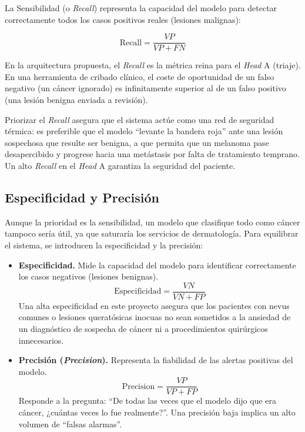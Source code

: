 La Sensibilidad (o \textit{Recall}) representa la capacidad del modelo para detectar correctamente todos los casos positivos reales (lesiones malignas):

\begin{equation}
	\text{Recall} = \frac{VP}{VP + FN}
\end{equation}

En la arquitectura propuesta, el \textit{Recall} es la métrica reina para el \textit{Head} A (triaje). En una herramienta de cribado clínico, el coste de oportunidad de un falso negativo (un cáncer ignorado) es infinitamente superior al de un falso positivo (una lesión benigna enviada a revisión).

Priorizar el \textit{Recall} asegura que el sistema actúe como una red de seguridad térmica: es preferible que el modelo ``levante la bandera roja'' ante una lesión sospechosa que resulte ser benigna, a que permita que un melanoma pase desapercibido y progrese hacia una metástasis por falta de tratamiento temprano. Un alto \textit{Recall} en el \textit{Head} A garantiza la seguridad del paciente.

\subsection{Especificidad y Precisión}

Aunque la prioridad es la sensibilidad, un modelo que clasifique todo como cáncer tampoco sería útil, ya que saturaría los servicios de dermatología. Para equilibrar el sistema, se introducen la especificidad y la precisión:

\begin{itemize}
	\item \textbf{Especificidad.} Mide la capacidad del modelo para identificar correctamente los casos negativos (lesiones benignas).
	\begin{equation}
		\text{Especificidad} = \frac{VN}{VN + FP}
	\end{equation}
	Una alta especificidad en este proyecto asegura que los pacientes con nevus comunes o lesiones queratósicas inocuas no sean sometidos a la ansiedad de un diagnóstico de sospecha de cáncer ni a procedimientos quirúrgicos innecesarios.
	
	\item \textbf{Precisión (\textit{Precision}).} Representa la fiabilidad de las alertas positivas del modelo. 
	\begin{equation}
		\text{Precision} = \frac{VP}{VP + FP}
	\end{equation}
	Responde a la pregunta: ``De todas las veces que el modelo dijo que era cáncer, ¿cuántas veces lo fue realmente?''. Una precisión baja implica un alto volumen de ``falsas alarmas''. 
\end{itemize}

